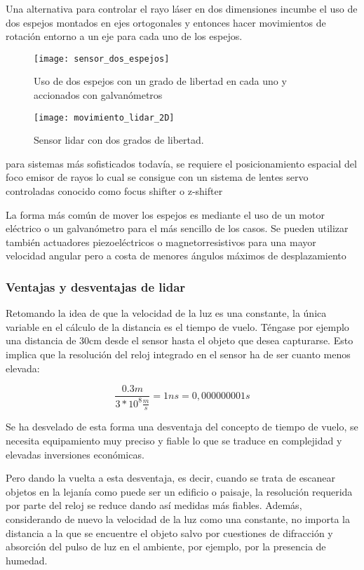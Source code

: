 Una alternativa para controlar el rayo láser en dos dimensiones incumbe el uso de dos espejos montados en ejes ortogonales y entonces hacer movimientos de rotación entorno a un eje para cada uno de los espejos.

\begin{figure}
  \texttt{[image: sensor\_dos\_espejos]}
  \caption{Uso de dos espejos con un grado de libertad en cada uno y accionados con galvanómetros}\label{fig:sensor dos espejos}
\endminipage\hfill
{}
  \texttt{[image: movimiento\_lidar\_2D]}
  \caption{Sensor lidar con dos grados de libertad.}\label{fig:movimiento lidar 2D}
\endminipage\hfill

\end{figure}


para sistemas más sofisticados todavía, se requiere el posicionamiento espacial del foco emisor de rayos lo cual se consigue con un sistema de lentes servo controladas conocido como focus shifter o z-shifter

La forma más común de mover los espejos es mediante el uso de un motor eléctrico o un galvanómetro para el más sencillo de los casos. Se pueden utilizar también actuadores piezoeléctricos o magnetorresistivos para una mayor velocidad angular pero a costa de menores ángulos máximos de desplazamiento

\subsubsection{Ventajas y desventajas de lidar}

Retomando la idea de que la velocidad de la luz es una constante, la única variable en el cálculo de la distancia es el tiempo de vuelo. Téngase por ejemplo una distancia de 30cm desde el sensor hasta el objeto que desea capturarse. Esto implica que la resolución del reloj integrado en el sensor ha de ser cuanto menos elevada:

\begin{equation}
\frac{0.3m}{3*10^{8}\frac{m}{s}} = 1ns =0,000000001s
\end{equation}

Se ha desvelado de esta forma una desventaja del concepto de tiempo de vuelo, se necesita equipamiento muy preciso y fiable lo que se traduce en complejidad y elevadas inversiones económicas.

Pero dando la vuelta a esta desventaja, es decir, cuando se trata de escanear objetos en la lejanía como puede ser un edificio o paisaje, la resolución requerida por parte del reloj se reduce dando así medidas más fiables. Además, considerando de nuevo la velocidad de la luz como una constante, no importa la distancia a la que se encuentre el objeto salvo por cuestiones de difracción y absorción del pulso de luz en el ambiente, por ejemplo, por la presencia de humedad.

